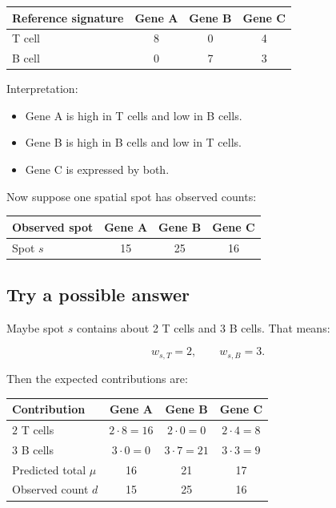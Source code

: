 \documentclass[11pt]{article}
\begin{document}
\begin{center}
\begin{tabular}{lccc}
\toprule
Reference signature & Gene A & Gene B & Gene C \\
\midrule
T cell & 8 & 0 & 4 \\
B cell & 0 & 7 & 3 \\
\bottomrule
\end{tabular}
\end{center}

Interpretation:

\begin{itemize}
  \item Gene A is high in T cells and low in B cells.
  \item Gene B is high in B cells and low in T cells.
  \item Gene C is expressed by both.
\end{itemize}

Now suppose one spatial spot has observed counts:

\begin{center}
\begin{tabular}{lccc}
\toprule
Observed spot & Gene A & Gene B & Gene C \\
\midrule
Spot $s$ & 15 & 25 & 16 \\
\bottomrule
\end{tabular}
\end{center}

\subsection{Try a possible answer}

Maybe spot $s$ contains about 2 T cells and 3 B cells. That means:

\[
w_{s,T}=2,
\qquad
w_{s,B}=3.
\]

Then the expected contributions are:

\begin{center}
\begin{tabular}{lccc}
\toprule
Contribution & Gene A & Gene B & Gene C \\
\midrule
$2$ T cells & $2\cdot 8=16$ & $2\cdot 0=0$ & $2\cdot 4=8$ \\
$3$ B cells & $3\cdot 0=0$ & $3\cdot 7=21$ & $3\cdot 3=9$ \\
\midrule
Predicted total $\mu$ & 16 & 21 & 17 \\
Observed count $d$ & 15 & 25 & 16 \\
\bottomrule
\end{tabular}
\end{center}
\end{document}

